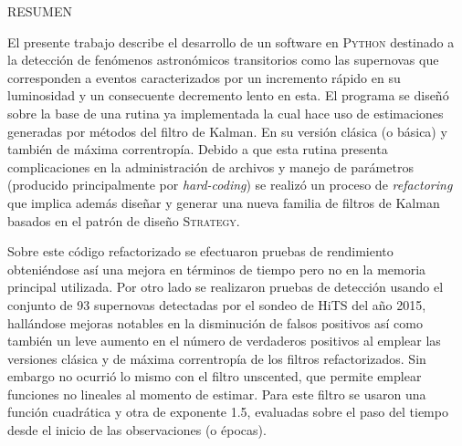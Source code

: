 


\begin{preface}
\begin{center}
\uppercase{Resumen}
\end{center}
El presente trabajo describe el desarrollo de un software en \textsc{Python} destinado a la detecci\'on de fen\'omenos astron\'omicos transitorios como las supernovas que corresponden a eventos caracterizados por un incremento r\'apido en su luminosidad y un consecuente decremento lento en esta. El programa se dise\~n\'o sobre la base de una rutina ya implementada la cual hace uso de estimaciones generadas por m\'etodos del filtro de Kalman. En su versi\'on cl\'asica (o b\'asica) y tambi\'en de m\'axima correntrop\'ia. Debido a que esta rutina presenta complicaciones en la administraci\'on de archivos y manejo de par\'ametros (producido principalmente por \textit{hard-coding}) se realiz\'o un proceso de \textit{refactoring} que implica adem\'as dise\~nar y generar una nueva familia de filtros de Kalman basados en el patr\'on de dise\~no \textsc{Strategy}.
\bigskip

Sobre este c\'odigo refactorizado se efectuaron pruebas de rendimiento obteni\'endose as\'i una mejora en t\'erminos de tiempo pero no en la memoria principal utilizada. Por otro lado se realizaron pruebas de detecci\'on usando el conjunto de 93 supernovas detectadas por el sondeo de HiTS del a\~no 2015, hall\'andose mejoras notables en la disminuci\'on de falsos positivos as\'i como tambi\'en un leve aumento en el n\'umero de verdaderos positivos al emplear las versiones cl\'asica y de m\'axima correntrop\'ia de los filtros refactorizados. Sin embargo no ocurri\'o lo mismo con el filtro unscented, que permite emplear funciones no lineales al momento de estimar. Para este filtro se usaron una funci\'on cuadr\'atica y otra de exponente 1.5, evaluadas sobre el paso del tiempo desde el inicio de las observaciones (o \'epocas).   
\bigskip


\end{preface}
